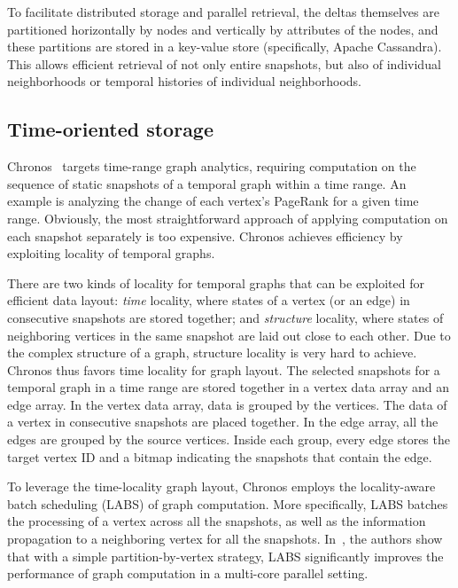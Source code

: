 \documentclass{svjour3}
\begin{document}
To facilitate distributed storage and parallel retrieval, the deltas themselves are partitioned horizontally by nodes and vertically by attributes 
of the nodes, and these partitions are stored in a key-value store (specifically, Apache Cassandra). This allows efficient retrieval of not only
entire snapshots, but also of individual neighborhoods or temporal histories of individual neighborhoods.


\subsection{Time-oriented storage}
Chronos~\cite{chronos} targets time-range graph analytics, requiring computation on the sequence of static snapshots of a temporal graph within a time range. An example is analyzing the change of each vertex's PageRank for a given time range. Obviously, the most straightforward approach of applying computation on each snapshot separately is too expensive. Chronos achieves efficiency by exploiting locality of temporal graphs.

\vspace{2mm}

 There are two kinds of locality for temporal graphs that can be exploited for efficient data layout: \emph{time} locality, where states of a vertex (or an edge) in consecutive snapshots are stored together; and \emph{structure} locality, where states of neighboring vertices in the same snapshot are laid out close to each other. Due to the complex structure of a graph, structure locality is very hard to achieve. Chronos thus favors time locality for graph layout. The selected snapshots for a temporal graph in a time range are stored together in a vertex data array and an edge array. In the vertex data array, data is grouped by the vertices. The data of a vertex in consecutive snapshots are placed together. In the edge array, all the edges are grouped by the source vertices. Inside each group, every edge stores the target vertex ID and a bitmap indicating the snapshots that contain the edge. 

\vspace{2mm}

 To leverage the time-locality graph layout, Chronos employs the locality-aware batch scheduling (LABS) of graph computation. More specifically, LABS batches the processing of a vertex across all the snapshots, as well as the information propagation to a neighboring vertex for all the snapshots. %
In~\cite{chronos}, the authors show that with a simple partition-by-vertex strategy, LABS significantly improves the performance of graph computation in a multi-core parallel setting.
\end{document}
